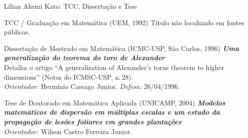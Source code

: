 \documentclass[10pt, aspectratio=169]{beamer}
\begin{document}
\begin{frame}{Lilian Akemi Kato: TCC, Dissertação e Tese}
    \transwipe[direction=90, duration=0.4]
    \footnotesize
    \begin{block}{TCC / Graduação em Matemática (UEM, 1992)}
        Título não localizado em fontes públicas.
    \end{block}
    \pause
    \begin{exampleblock}{Dissertação de Mestrado em Matemática (ICMC-USP, São Carlos, 1996)}
        \textbf{\emph{Uma generalização do teorema do toro de Alexander}} \\
        Detalha o artigo ``A generalization of Alexander's torus theorem to higher dimensions'' (Notas do ICMSC-USP, n.\,28). \\
        \emph{Orientador:} Hermínio Cassago Junior. \emph{Defesa:} 26/04/1996.
    \end{exampleblock}
    \pause
    \begin{alertblock}{Tese de Doutorado em Matemática Aplicada (UNICAMP, 2004)}
        \textbf{\emph{Modelos matemáticos de dispersão em múltiplas escalas e um estudo da propagação de lesões foliares em grandes plantações}} \\
        \emph{Orientador:} Wilson Castro Ferreira Junior.
    \end{alertblock}
\end{frame}

\end{document}
